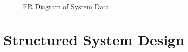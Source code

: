 \begin{figure}[H]
    \centering
    \caption{ER Diagram of System Data}
\end{figure}
\newpage
\section{Structured System Design}
